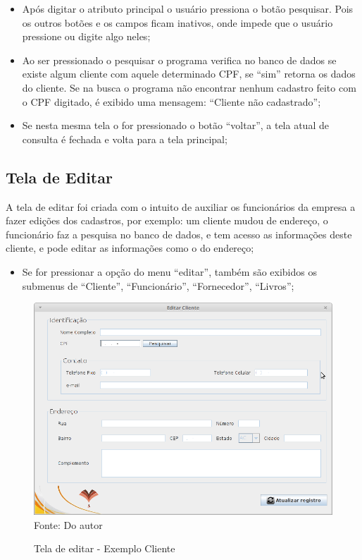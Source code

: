 \begin{itemize}
 \item Após digitar o atributo principal o usuário pressiona o botão pesquisar. Pois os outros botões e os campos ficam inativos, onde impede que o usuário pressione ou digite algo neles;

 \item Ao ser pressionado o pesquisar o programa verifica no banco de dados se existe algum cliente com aquele determinado CPF, se “sim” retorna os dados do cliente. Se na busca o programa não encontrar nenhum cadastro feito com o CPF digitado, é exibido uma mensagem: “Cliente não cadastrado”; 

 \item Se nesta mesma tela o for pressionado o botão “voltar”, a tela atual de consulta é fechada e volta para a tela principal;
\end{itemize}


\subsection{Tela de Editar}

A  tela de editar foi criada com o intuito de auxiliar os funcionários da empresa a fazer edições dos cadastros, por exemplo:
um cliente mudou de endereço, o funcionário faz a pesquisa no banco de dados, e tem acesso as informações deste cliente, e pode
editar as informações como o do endereço;

\begin{itemize}
 \item Se for pressionar a opção do menu “editar”, também são exibidos os submenus de “Cliente”, “Funcionário”, “Fornecedor”, “Livros”; 
\end{itemize}

\begin{figure}[H]
	\centering 
	\caption{Tela de editar - Exemplo Cliente}
	\label{editar_cliente}
	\includegraphics[scale = 0.6]{imagens/tela-editar-cliente.png}
	\\Fonte: Do autor
\end{figure}

